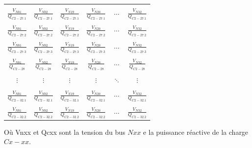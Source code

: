 \begin{enumerate}[\bfseries 4.3.1]
\begin{table}[H]
{\begin{tabular}{cccccc}
				&&&&&\\
				$\frac{V_{N01}}{Q_{C 2-27.1}}$& $\frac{V_{N02}}{Q_{C 2-27.1}}$& $\frac{V_{N19}}{Q_{C 2-27.1}}$& $\frac{V_{N20}}{Q_{C 2-27.1}}$&$ \cdots $&$\frac{V_{N32}}{Q_{C 2-27.1}}$\\
				&&&&&\\
				$\frac{V_{N01}}{Q_{C 2-27.2}}$& $\frac{V_{N02}}{Q_{C 2-27.2}}$& $\frac{V_{N19}}{Q_{C 2-27.2}}$& $\frac{V_{N20}}{Q_{C 2-27.2}}$&$ \cdots $&$\frac{V_{N32}}{Q_{C 2-27.2}}$\\
				&&&&&\\				
				$\frac{V_{N01}}{Q_{C 2-27.3}}$& $\frac{V_{N02}}{Q_{C 2-27.3}}$& $\frac{V_{N19}}{Q_{C 2-27.3}}$& $\frac{V_{N20}}{Q_{C 2-27.3}}$&$ \cdots$&$\frac{V_{N32}}{Q_{C 2-27.3}}$\\
				&&&&&\\
				$\frac{V_{N01}}{Q_{C 2-28}}$& $\frac{V_{N02}}{Q_{C 2-28}}$& $\frac{V_{N19}}{Q_{C 2-28}}$& $\frac{V_{N20}}{Q_{C 2-28}}$&$\cdots$&$\frac{V_{N32}}{Q_{C 2-28}}$\\
				&&&&&\\
				$ \vdots $&$ \vdots $&$ \vdots $&$ \vdots $&$ \ddots $&$ \vdots $\\
				&&&&&\\
				$\frac{V_{N01}}{Q_{C 2-32.1}}$& $\frac{V_{N02}}{Q_{C 2-32.1}}$& $\frac{V_{N19}}{Q_{C 2-32.1}}$& $\frac{V_{N20}}{Q_{C 2-32.1}}$&$\cdots$&$\frac{V_{N32}}{Q_{C 2-32.1}}$\\
				&&&&&\\
				$\frac{V_{N01}}{Q_{C 2-32.2}}$& $\frac{V_{N02}}{Q_{C 2-32.2}}$& $\frac{V_{N19}}{Q_{C 2-32.2}}$& $\frac{V_{N20}}{Q_{C 2-32.2}}$&$\cdots$&$\frac{V_{N32}}{Q_{C 2-32.2}}$\\
		\end{tabular}}		
	\end{table}
	Où \gls{Vnxx}  et \gls{Qcxx} sont la tension du bus $ Nxx $ e la puissance réactive de la charge $ Cx-xx $.
	

\end{enumerate}
